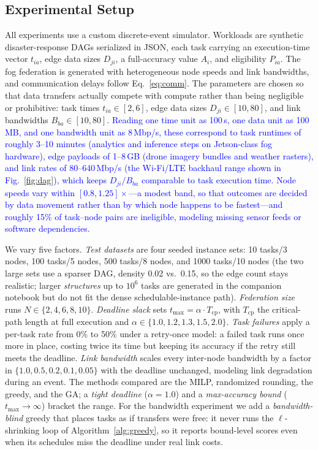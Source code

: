 \documentclass[conference]{IEEEtran}
\newcommand{\rev}[1]{\textcolor{blue}{#1}}%
\begin{document}
\subsection{Experimental Setup}

All experiments use a custom discrete-event simulator. Workloads are synthetic disaster-response DAGs serialized in JSON, each task carrying an execution-time vector $t_{ia}$, edge data sizes $D_{ji}$, a full-accuracy value $A_i$, and eligibility $P_{ia}$. The fog federation is generated with heterogeneous node speeds and link bandwidths, and communication delays follow Eq.~\eqref{eq:comm}. The parameters are chosen so that data transfers actually compete with compute rather than being negligible or prohibitive: task times $t_{ia}\in[2,6]$, edge data sizes $D_{ji}\in[10,80]$, and link bandwidths $B_{ba}\in[10,80]$. \rev{Reading one time unit as 100\,s, one data unit as 100\,MB, and one bandwidth unit as 8\,Mbp/s, these correspond to task runtimes of roughly 3--10 minutes (analytics and inference steps on Jetson-class fog hardware), edge payloads of 1--8\,GB (drone imagery bundles and weather rasters), and link rates of 80--640\,Mbp/s (the Wi-Fi/LTE backhaul range shown in Fig.~\ref{fig:dag}), which keeps $D_{ji}/B_{ba}$ comparable to task execution time. Node speeds vary within $[0.8,1.25]\times$---a modest band, so that outcomes are decided by data movement rather than by which node happens to be fastest---and roughly 15\% of task--node pairs are ineligible, modeling missing sensor feeds or software dependencies.}

We vary five factors. \emph{Test datasets} are four seeded instance
sets: 10 tasks/3 nodes, 100 tasks/5 nodes, 500 tasks/8 nodes, and 1000
tasks/10 nodes (the two large sets use a sparser DAG, density 0.02
vs.\ 0.15, so the edge count stays realistic; larger \emph{structures}
up to $10^6$ tasks are generated in the companion notebook but do not
fit the dense schedulable-instance path). \emph{Federation size} runs
$N\in\{2,4,6,8,10\}$. \emph{Deadline slack} sets
$t_{\max}=\alpha\cdot T_{\mathrm{cp}}$, with $T_{\mathrm{cp}}$ the
critical-path length at full execution and
$\alpha\in\{1.0,1.2,1.3,1.5,2.0\}$. \emph{Task failures} apply a
per-task rate from 0\% to 50\% under a retry-once model: a failed task
runs once more in place, costing twice its time but keeping its
accuracy if the retry still meets the deadline. \emph{Link bandwidth}
scales every inter-node bandwidth by a factor in
$\{1.0,0.5,0.2,0.1,0.05\}$ with the deadline unchanged, modeling link
degradation during an event. The methods compared are the MILP,
randomized rounding, the greedy, and the GA; a \emph{tight deadline}
($\alpha{=}1.0$) and a \emph{max-accuracy bound}
($t_{\max}\!\to\!\infty$) bracket the range. For the bandwidth
experiment we add a \emph{bandwidth-blind} greedy that places tasks as
if transfers were free: it never runs the $\ell$-shrinking loop of
Algorithm~\ref{alg:greedy}, so it reports bound-level scores even when
its schedules miss the deadline under real link costs.
\end{document}
